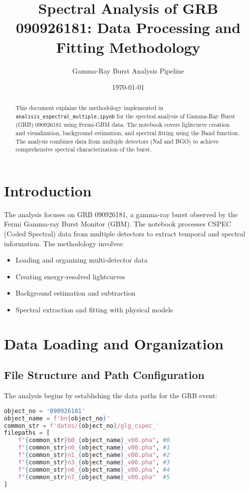 \documentclass{article}
\title{Spectral Analysis of GRB 090926181: Data Processing and Fitting Methodology}
\author{Gamma-Ray Burst Analysis Pipeline}
\date{\today}
\begin{document}
\maketitle

\begin{abstract}
This document explains the methodology implemented in \texttt{analisis\_espectral\_multiple.ipynb} for the spectral analysis of Gamma-Ray Burst (GRB) 090926181 using Fermi-GBM data. The notebook covers lightcurve creation and visualization, background estimation, and spectral fitting using the Band function. The analysis combines data from multiple detectors (NaI and BGO) to achieve comprehensive spectral characterization of the burst.
\end{abstract}

\section{Introduction}

The analysis focuses on GRB 090926181, a gamma-ray burst observed by the Fermi Gamma-ray Burst Monitor (GBM). The notebook processes CSPEC (Coded Spectral) data from multiple detectors to extract temporal and spectral information. The methodology involves:

\begin{itemize}
    \item Loading and organizing multi-detector data
    \item Creating energy-resolved lightcurves
    \item Background estimation and subtraction
    \item Spectral extraction and fitting with physical models
\end{itemize}

\section{Data Loading and Organization}

\subsection{File Structure and Path Configuration}

The analysis begins by establishing the data paths for the GRB event:

\begin{lstlisting}[language=Python]
object_no = '090926181'
object_name = f'bn{object_no}'
common_str = f'datos/{object_no}/glg_cspec_'
filepaths = [
    f"{common_str}b0_{object_name}_v00.pha", #0
    f"{common_str}n0_{object_name}_v00.pha", #1
    f"{common_str}n1_{object_name}_v00.pha", #2
    f"{common_str}n3_{object_name}_v00.pha", #3
    f"{common_str}n6_{object_name}_v00.pha", #4
    f"{common_str}n7_{object_name}_v00.pha"  #5
]
\end{lstlisting}
\end{document}
